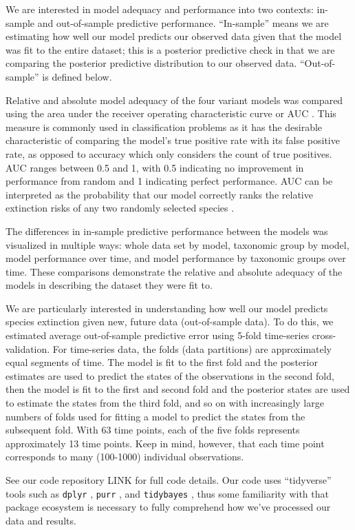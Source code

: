 \documentclass[12pt,letterpaper]{article}
\begin{document}
We are interested in model adequacy and performance into two contexts: in-sample and out-of-sample predictive performance. ``In-sample'' means we are estimating how well our model predicts our observed data given that the model was fit to the entire dataset; this is a posterior predictive check in that we are comparing the posterior predictive distribution to our observed data. ``Out-of-sample'' is defined below.

Relative and absolute model adequacy of the four variant models was compared using the area under the receiver operating characteristic curve or AUC \citep{Fawcett2006,Mason2002}. This measure is commonly used in classification problems as it has the desirable characteristic of comparing the model's true positive rate with its false positive rate, as opposed to accuracy which only considers the count of true positives. AUC ranges between 0.5 and 1, with 0.5 indicating no improvement in performance from random and 1 indicating perfect performance. AUC can be interpreted as the probability that our model correctly ranks the relative extinction risks of any two randomly selected species \citep{Fawcett2006,Mason2002}.

The differences in in-sample predictive performance between the models was visualized in multiple ways: whole data set by model, taxonomic group by model, model performance over time, and model performance by taxonomic groups over time. These comparisons demonstrate the relative and absolute adequacy of the models in describing the dataset they were fit to.

We are particularly interested in understanding how well our model predicts species extinction given new, future data (out-of-sample data). To do this, we estimated average out-of-sample predictive error using 5-fold time-series cross-validation. For time-series data, the folds (data partitions) are approximately equal segments of time. The model is fit to the first fold and the posterior estimates are used to predict the states of the observations in the second fold, then the model is fit to the first and second fold and the posterior states are used to estimate the states from the third fold, and so on with increasingly large numbers of folds used for fitting a model to predict the states from the subsequent fold. With 63 time points, each of the five folds represents approximately 13 time points. Keep in mind, however, that each time point corresponds to many (100-1000) individual observations.


See our code repository LINK for full code details. Our code uses ``tidyverse'' tools such as \texttt{dplyr} \citep{dplyr}, \texttt{purr} \citep{purrr}, and \texttt{tidybayes} \citep{tidybayes}, thus some familiarity with that package ecosystem is necessary to fully comprehend how we've processed our data and results.
\end{document}
